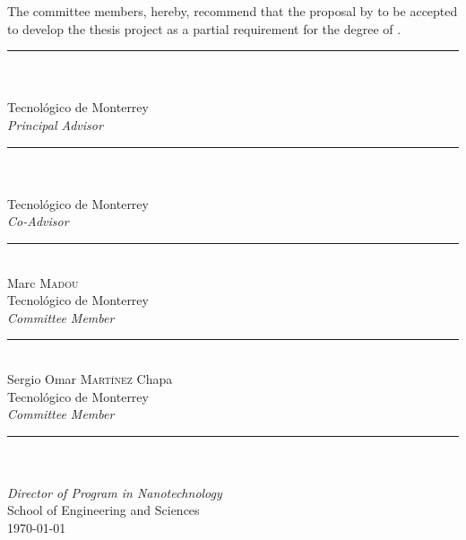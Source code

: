 \documentclass[
11pt, 
oneside,
english,
onehalfspacing,
onehalfspacing,
parskip,
headsepline,
chapterinoneline,
]{MastersDoctoralThesis}
\begin{document}
\begin{committee}
\addchaptertocentry{\supervisingcommittee} %
The committee members, hereby, recommend that the proposal by \authorname \text{ }to be accepted to develop the thesis project as a partial requirement for the degree of \degreename.

\begin{flushright} \large

\bigskip
\bigskip
\medskip

\noindent \rule[0.0em]{15em}{0.5pt}\\ %
\supname\\
Tecnológico de Monterrey\\
\emph{Principal Advisor}

\bigskip
\bigskip
\medskip

\noindent \rule[0.0em]{15em}{0.5pt}\\ %
\cosupname\\
Tecnológico de Monterrey\\
\emph{Co-Advisor}

\bigskip
\bigskip
\medskip

\noindent \rule[0.0em]{15em}{0.5pt}\\ %
Marc \textsc{Madou}\\
Tecnológico de Monterrey\\
\emph{Committee Member}

\bigskip
\bigskip
\medskip

\noindent \rule[0.0em]{15em}{0.5pt}\\ %
Sergio Omar \textsc{Martínez} Chapa\\
Tecnológico de Monterrey\\
\emph{Committee Member}

\end{flushright}

\vfill

\begin{center}

\bigskip
\bigskip
\medskip

\noindent \rule[0.0em]{15em}{0.5pt}\\ %
\cosupname \\
\emph{Director of Program in Nanotechnology}\\
School of Engineering and Sciences\\

\bigskip
{\addressname \text{, } \large \today}\\[0cm]

\end{center}
\end{committee}
\end{document}
